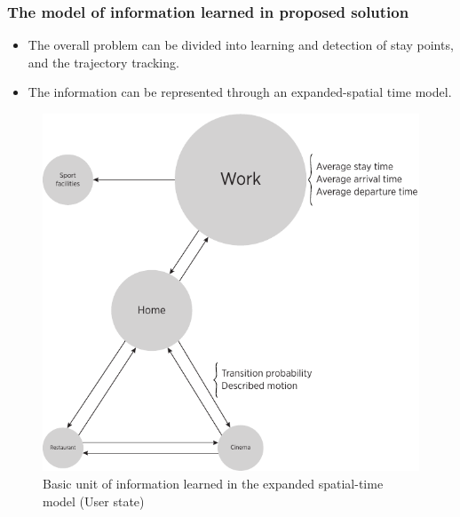 \documentclass[compress,9pt,xcolor={dvipsnames,table}]{beamer}
\begin{document}
\begin{frame}[t]\frametitle{The model of information learned in proposed solution}
\small
\begin{itemize}
  \item The overall problem can be divided into learning and detection of stay points, and the trajectory tracking.
\item The information can be represented through an expanded-spatial time model. 
\end{itemize}

\begin{figure}[tb]
  \centering
  \includegraphics[scale=0.45]{../../../resources/images/vectors/mobility-graph}
  \caption{Basic unit of information learned in the expanded spatial-time model (User state)}
  \label{fig:basic-unit-of-information-learned}
\end{figure}
\end{frame}
\end{document}
